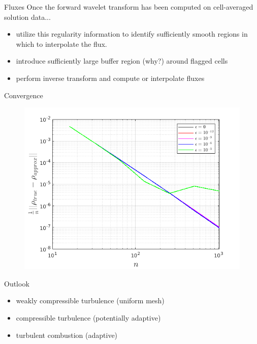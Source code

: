\documentclass{beamer}
\begin{document}
\begin{frame}{Fluxes}
    Once the forward wavelet transform has been computed on cell-averaged solution data...
    \begin{itemize}
        \item<2-> utilize this regularity information to identify sufficiently smooth regions
            in which to interpolate the flux.
          \item<3-> introduce sufficiently large buffer region (why?) around flagged cells
        \item<4-> perform inverse transform and compute or interpolate fluxes
    \end{itemize}
\end{frame}

\begin{frame}{Convergence}
  \begin{figure}
    \center
    \includegraphics[scale=0.5]{convergence.png}
  \end{figure}
\end{frame}

\begin{frame}{Outlook}
  \begin{itemize}
    \item weakly compressible turbulence (uniform mesh)
    \item compressible turbulence (potentially adaptive)
    \item turbulent combustion (adaptive)
  \end{itemize}
\end{frame}
\end{document}
